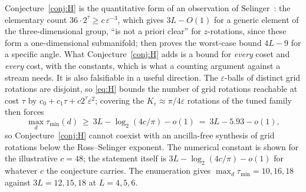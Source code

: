 \documentclass[aps,prx,twocolumn,superscriptaddress,nofootinbib,longbibliography]{revtex4-2}
\theoremstyle{plain}
\theoremstyle{definition}
\theoremstyle{remark}
\begin{document}
Conjecture~\ref{conj:H} is the quantitative form of an observation of Selinger~\cite[\S9]{Selinger15}: the elementary count $36\cdot2^\tau\ge c\,\varepsilon^{-3}$, which gives $3L-O(1)$ for a generic element of the three-dimensional group, ``is not a priori clear'' for $z$-rotations, since these form a one-dimensional submanifold; \cite[Thm.~30]{Selinger15} then proves the worst-case bound $4L-9$ for a specific angle. What Conjecture~\ref{conj:H} adds is a bound for \emph{every} coset and \emph{every} cost, with the constants, which is what a counting argument against a stream needs. It is also falsifiable in a useful direction. The $\varepsilon$-balls of distinct grid rotations are disjoint, so \eqref{eq:H} bounds the number of grid rotations reachable at cost $\tau$ by $c_0+c_1\tau+c2^\tau\varepsilon^2$; covering the $K_\varepsilon\approx\pi/4\varepsilon$ rotations of the tuned family then forces
\begin{equation}\label{eq:Hcons}
\max_d\tau_{\min}(d)\ \ge\ 3L-\log_2(4c/\pi)-o(1)\ =\ 3L-5.93-o(1),
\end{equation}
so Conjecture~\ref{conj:H} cannot coexist with an ancilla-free synthesis of grid rotations below the Ross--Selinger exponent. The numerical constant is shown for the illustrative $c=48$; the statement itself is $3L-\log_2(4c/\pi)-o(1)$ for whatever $c$ the conjecture carries. The enumeration gives $\max_d\tau_{\min}=10,16,18$ against $3L=12,15,18$ at $L=4,5,6$.
\end{document}
